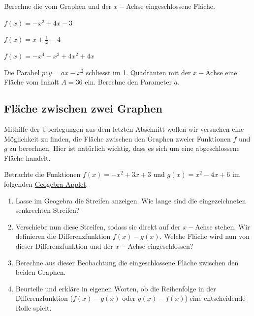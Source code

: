 \documentclass[11pt,oneside]{article}
\begin{document}
	\begin{aufgabe}
		Berechne die vom Graphen und der $x-$Achse eingeschlossene Fläche.
		\begin{enumcols}[3]
			\item $f(x)=-x^2+4x-3$
			\item $f(x)=x+\frac{1}{x}-4$
			\item $f(x)=-x^4-x^3+4x^2+4x$
		\end{enumcols}
	\end{aufgabe}
	\begin{aufgabe}
		Die Parabel $p:y=ax-x^2$ schliesst im 1. Quadranten mit der $x-$Achse eine Fläche vom Inhalt $A=36$ ein. Berechne den Parameter $a$.
	\end{aufgabe}

\subsection{Fläche zwischen zwei Graphen}
	Mithilfe der Überlegungen aus dem letzten Abschnitt wollen wir versuchen eine Möglichkeit zu finden, die Fläche zwischen den Graphen zweier Funktionen $f$ und $g$ zu berechnen. Hier ist natürlich wichtig, dass es sich um eine abgeschlossene Fläche handelt.
	\begin{aufgabe}
		Betrachte die Funktionen $f(x)=-x^2+3x+3$ und $g(x)=x^2-4x+6$ im folgenden \href{https://www.geogebra.org/m/gfdvryzw}{Geogebra-Applet}\footnotemark.
		\begin{enumerate}[label=\alph*)]
			\item Lasse im Geogebra die \flqq Streifen anzeigen\frqq. Wie lange sind die eingezeichneten senkrechten Streifen?\\[5pt]\karos{1.5}
			\item Verschiebe nun diese Streifen, sodass sie direkt auf der $x-$Achse stehen. Wir definieren die Differenzfunktion $f(x)-g(x)$. Welche Fläche wird nun von dieser Differenzfunktion und der $x-$Achse eingeschlossen?\\[5pt]\karos{1.5}
			\item Berechne aus dieser Beobachtung die eingeschlossene Fläche zwischen den beiden Graphen.\\[5pt]\karos{4.5}
			\item Beurteile und erkläre in eigenen Worten, ob die Reihenfolge in der Differenzfunktion ($f(x)-g(x)$ oder $g(x)-f(x)$) eine entscheidende Rolle spielt.\\[5pt]\karos{2.5}
		\end{enumerate}
	\end{aufgabe}
\end{document}
